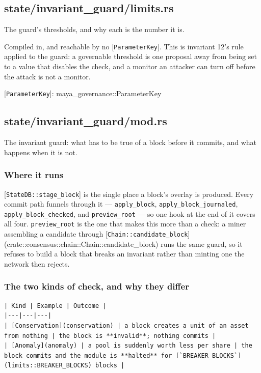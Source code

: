 \documentclass[11pt,a4paper]{article}
\begin{document}
\subsection{state/invariant\_guard/limits.rs}
The guard's thresholds, and why each is the number it is.

Compiled in, and reachable by no [\texttt{ParameterKey}]. This is invariant 12's
rule applied to the guard: a governable threshold is one proposal away from
being set to a value that disables the check, and a monitor an attacker can
turn off before the attack is not a monitor.

[\texttt{ParameterKey}]: maya\_governance::ParameterKey

\subsection{state/invariant\_guard/mod.rs}
The invariant guard: what has to be true of a block before it commits, and
what happens when it is not.

\subsubsection{Where it runs}

[\texttt{StateDB::stage\_block}] is the single place a block's overlay is produced.
Every commit path funnels through it — \texttt{apply\_block},
\texttt{apply\_block\_journaled}, \texttt{apply\_block\_checked}, and \texttt{preview\_root} — so one
hook at the end of it covers all four. \texttt{preview\_root} is the one that makes
this more than a check: a miner assembling a candidate through
[\texttt{Chain::candidate\_block}](crate::consensus::chain::Chain::candidate\_block)
runs the same guard, so it refuses to build a block that breaks an invariant
rather than minting one the network then rejects.

\subsubsection{The two kinds of check, and why they differ}

\begin{verbatim}
| Kind | Example | Outcome |
|---|---|---|
| [Conservation](conservation) | a block creates a unit of an asset from nothing | the block is **invalid**; nothing commits |
| [Anomaly](anomaly) | a pool is suddenly worth less per share | the block commits and the module is **halted** for [`BREAKER_BLOCKS`](limits::BREAKER_BLOCKS) blocks |
\end{verbatim}
\end{document}
